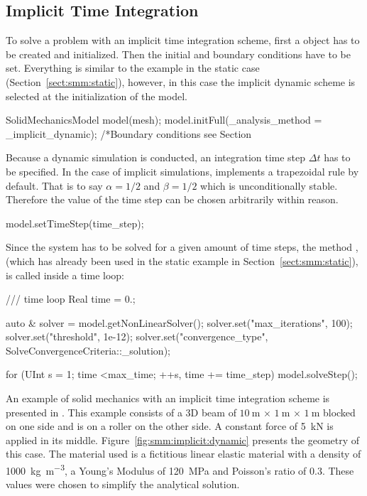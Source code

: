 

\subsection{Implicit Time Integration}
To solve a problem with an implicit time integration scheme, first a
 object has to be created and initialized.
Then the initial and boundary conditions have to be set.  Everything
is similar to the example in the static case
(Section~\ref{sect:smm:static}), however, in this case the implicit
dynamic scheme is selected at the initialization of the model.

\begin{cpp}
SolidMechanicsModel model(mesh);
model.initFull(_analysis_method = _implicit_dynamic);
/*Boundary conditions see Section ~ %
\end{cpp}
Because a dynamic simulation is conducted, an integration time step
$\Delta t$ has to be specified. In the case of implicit simulations,
\akantu implements a trapezoidal rule by default.  That is to say
$\alpha = 1/2$ and $\beta = 1/2$ which is unconditionally
stable. Therefore the value of the time step can be chosen arbitrarily
within reason.  
\begin{cpp}
model.setTimeStep(time_step);
\end{cpp}
Since the system has to be solved for a given amount of time steps, the
method , (which has already been used in the static
example in Section~\ref{sect:smm:static}), is called inside a time
loop:
\begin{cpp}
/// time loop
Real time = 0.;

auto & solver = model.getNonLinearSolver();
solver.set("max_iterations", 100);
solver.set("threshold", 1e-12);
solver.set("convergence_type", SolveConvergenceCriteria::_solution);

for (UInt s = 1; time <max_time; ++s, time += time_step) {
  model.solveStep();
}
\end{cpp}
An example of solid mechanics with an implicit time integration scheme
is presented in
.  This example
consists of a 3D beam of
$\SI{10}{\metre}\,\times\,\SI{1}{\metre}\,\times\,\SI{1}{\metre}$
blocked on one side and is on a roller on the other side.  A constant
force of \SI{5}{\kilo\newton} is applied in its middle.
Figure~\ref{fig:smm:implicit:dynamic} presents the geometry of this
case. The material used is a fictitious linear elastic material with a
density of \SI{1000}{\kilo\gram\per\cubic\metre}, a Young's Modulus of
\SI{120}{\mega\pascal} and Poisson's ratio of $0.3$. These values
were chosen to simplify the analytical solution.

